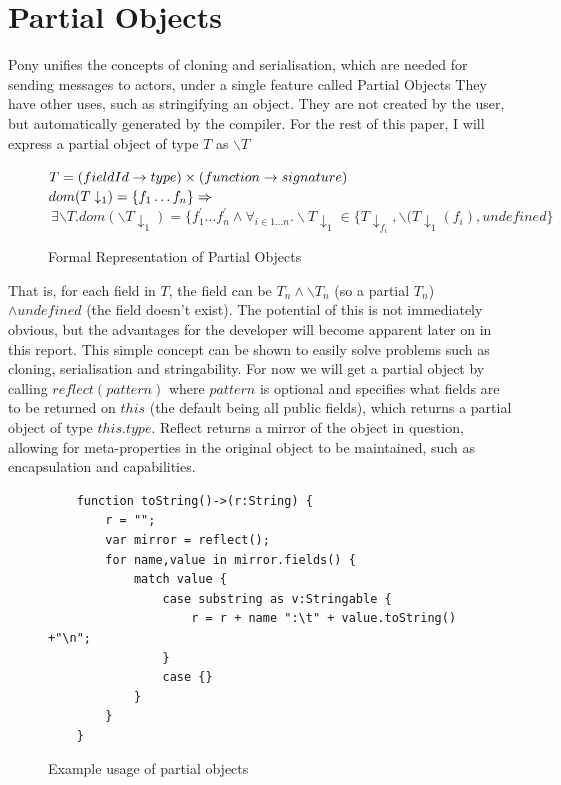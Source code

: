 \documentclass[11pt,a4paper]{report}
\begin{document}
\section{Partial Objects}

Pony unifies the concepts of cloning and serialisation, which are needed for sending messages to actors, under a single feature called Partial Objects
They have other uses, such as stringifying an object.
They are not created by the user, but automatically generated by the compiler.
For the rest of this paper, I will express a partial object of type $T$ as $\backslash T$

\begin{figure}[H]
$T = (fieldId \to type) \times (function \to signature)\\$
$dom(T\downarrow_{1}) = \{ f_{1} \dots f_{n} \} \Rightarrow\\$
$\> \exists \backslash T.dom(\backslash T\downarrow_{1}) = \{f_{1}^{'}\dots f_{n}^{'}\wedge
\forall_{i\in 1\dots n}.\backslash T\downarrow_{1} \in \{T\downarrow_{f_{i}},
\backslash(T\downarrow_{1}(f_{i}), undefined\}$
\caption{Formal Representation of Partial Objects}
\end{figure}

That is, for each field in $T$, the field can be $T_{n} \wedge \backslash T_{n}$ (so a partial $T_{n}$) $\wedge undefined$ (the field doesn't exist).
The potential of this is not immediately obvious, but the advantages for the developer will become apparent later on in this report.
This simple concept can be shown to easily solve problems such as cloning, serialisation and stringability.
For now we will get a partial object by calling $reflect(pattern)$ where $pattern$ is optional and specifies what fields are to be returned on $this$ (the default being all public fields), which returns a partial object of type $this.type$.
Reflect returns a mirror\cite{mirror-paper} of the object in question, allowing for meta-properties in the original object to be maintained, such as encapsulation and capabilities.

\begin{figure}[H]
\begin{verbatim}
    function toString()->(r:String) {
        r = "";
        var mirror = reflect();
        for name,value in mirror.fields() {
            match value {
                case substring as v:Stringable {
                    r = r + name ":\t" + value.toString() +"\n";
                }
                case {}
            }
        }
    }
\end{verbatim}
\caption{Example usage of partial objects}
\label{fig:partialobj}
\end{figure}
\end{document}
